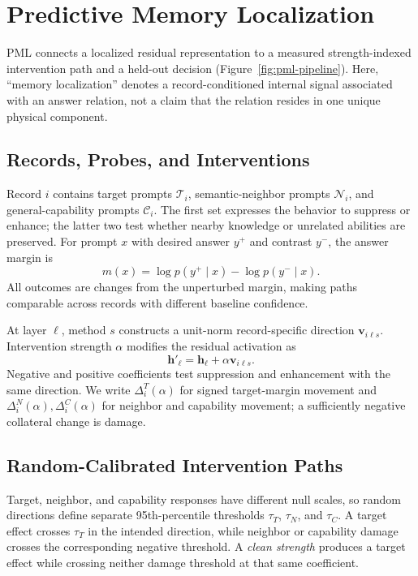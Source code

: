 \section{Predictive Memory Localization}

PML connects a localized residual representation to a measured strength-indexed
intervention path and a held-out decision (Figure~\ref{fig:pml-pipeline}). Here,
``memory localization'' denotes a record-conditioned internal signal associated
with an answer relation, not a claim that the relation resides in one unique
physical component.

\subsection{Records, Probes, and Interventions}

Record $i$ contains target prompts $\mathcal{T}_i$, semantic-neighbor prompts
$\mathcal{N}_i$, and general-capability prompts $\mathcal{C}_i$. The first set
expresses the behavior to suppress or enhance; the latter two test whether
nearby knowledge or unrelated abilities are preserved. For prompt $x$ with
desired answer $y^+$ and contrast $y^-$, the answer margin is
\begin{equation}
    m(x)=\log p(y^+\mid x)-\log p(y^-\mid x).
\end{equation}
All outcomes are changes from the unperturbed margin, making paths comparable
across records with different baseline confidence.

At layer $\ell$, method $s$ constructs a unit-norm record-specific direction
$\mathbf{v}_{i\ell s}$. Intervention strength $\alpha$ modifies the residual
activation as
\begin{equation}
    \mathbf{h}'_{\ell}=\mathbf{h}_{\ell}+\alpha\mathbf{v}_{i\ell s}.
\end{equation}
Negative and positive coefficients test suppression and enhancement with the
same direction. We write $\Delta^T_i(\alpha)$ for signed target-margin movement
and $\Delta^N_i(\alpha),\Delta^C_i(\alpha)$ for neighbor and capability
movement; a sufficiently negative collateral change is damage.

\subsection{Random-Calibrated Intervention Paths}

Target, neighbor, and capability responses have different null scales, so
random directions define separate 95th-percentile thresholds $\tau_T$,
$\tau_N$, and $\tau_C$. A target effect crosses $\tau_T$ in the intended
direction, while neighbor or capability damage crosses the corresponding
negative threshold. A \emph{clean strength} produces a target effect while
crossing neither damage threshold at that same coefficient.

